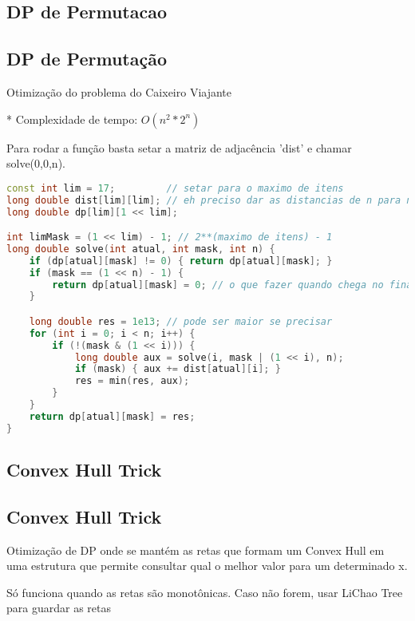 \documentclass[11pt, a4paper, twoside]{article}
\begin{document}
\subsection{DP de Permutacao}

\subsection{DP de Permutação}



Otimização do problema do Caixeiro Viajante

* Complexidade de tempo: $O(n^2 * 2^n)$

Para rodar a função basta setar a matriz de adjacência 'dist' e chamar solve(0,0,n).

\begin{lstlisting}[language=C++]
const int lim = 17;         // setar para o maximo de itens
long double dist[lim][lim]; // eh preciso dar as distancias de n para n
long double dp[lim][1 << lim];

int limMask = (1 << lim) - 1; // 2**(maximo de itens) - 1
long double solve(int atual, int mask, int n) {
    if (dp[atual][mask] != 0) { return dp[atual][mask]; }
    if (mask == (1 << n) - 1) {
        return dp[atual][mask] = 0; // o que fazer quando chega no final
    }

    long double res = 1e13; // pode ser maior se precisar
    for (int i = 0; i < n; i++) {
        if (!(mask & (1 << i))) {
            long double aux = solve(i, mask | (1 << i), n);
            if (mask) { aux += dist[atual][i]; }
            res = min(res, aux);
        }
    }
    return dp[atual][mask] = res;
}
\end{lstlisting}

\subsection{Convex Hull Trick}

\subsection{Convex Hull Trick}


Otimização de DP onde se mantém as retas que formam um Convex Hull em uma estrutura que permite consultar qual o melhor valor para um determinado x.

Só funciona quando as retas são monotônicas. Caso não forem, usar LiChao Tree para guardar as retas
\end{document}
